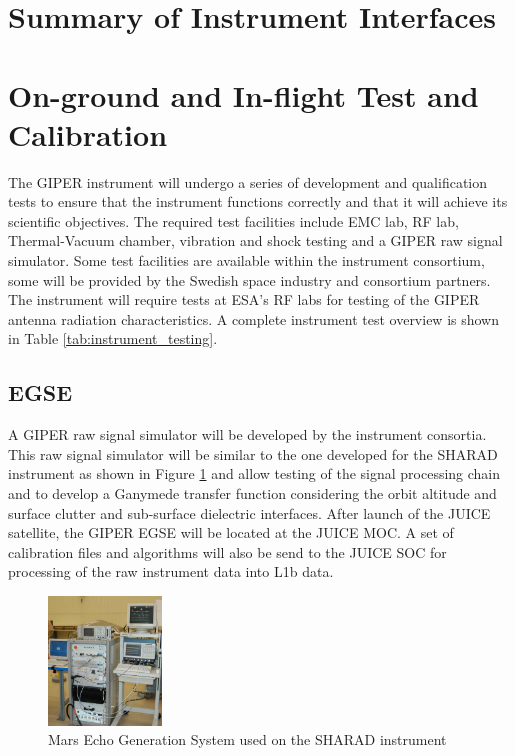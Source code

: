 \section{Summary of Instrument Interfaces}
%
\section{On-ground and In-flight Test and Calibration}
%
The \ac{GIPER} instrument will undergo a series of development and qualification tests to ensure that the instrument functions correctly and that it will achieve its scientific objectives. The required test facilities include \ac{EMC} lab, RF lab, Thermal-Vacuum chamber, vibration and shock testing and a \ac{GIPER} raw signal simulator. Some test facilities are available within the instrument consortium, some will be provided by the Swedish space industry and consortium partners. The instrument will require tests at ESA's \ac{RF} labs for testing of the \ac{GIPER} antenna radiation characteristics. A complete instrument test overview is shown in Table \ref{tab:instrument_testing}.
%
\subsection{EGSE}
A \ac{GIPER} raw signal simulator will be developed by the instrument consortia. This raw signal simulator will be similar to the one developed for the \ac{SHARAD} instrument\cite{Giovanni} as shown in Figure \ref{fig:MEGS} and allow testing of the signal processing chain and to develop a Ganymede transfer function considering the orbit altitude and surface clutter and sub-surface dielectric interfaces. After launch of the JUICE satellite, the \ac{GIPER} \ac{EGSE} will be located at the JUICE \ac{MOC}. A set of calibration files and algorithms will also be send to the JUICE \ac{SOC} for processing of the raw instrument data into L1b data.
%
\begin{figure}
\centering
\includegraphics[width=0.27\textwidth]{Figures/MEGS}
\caption[caption]{Mars Echo Generation System used on the SHARAD instrument\cite{MEGS}}
\label{fig:MEGS}
\end{figure}
%
